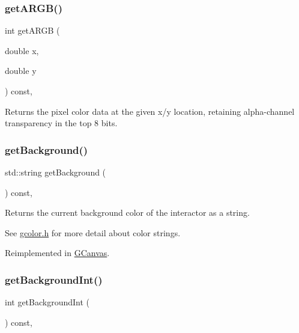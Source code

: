 \subsubsection{\texorpdfstring{get\+A\+R\+G\+B()}{getARGB()}}
{\footnotesize\ttfamily int get\+A\+R\+GB (\begin{DoxyParamCaption}\item[{double}]{x,  }\item[{double}]{y }\end{DoxyParamCaption}) const\hspace{0.3cm}{\ttfamily [virtual]}, {\ttfamily [inherited]}}



Returns the pixel color data at the given x/y location, retaining alpha-\/channel transparency in the top 8 bits. 

\mbox{\label{classGDrawingSurface_a808e22cc1fdfbecf71ed8c64ef4600e0}} 
\subsubsection{\texorpdfstring{get\+Background()}{getBackground()}}
{\footnotesize\ttfamily std\+::string get\+Background (\begin{DoxyParamCaption}{ }\end{DoxyParamCaption}) const\hspace{0.3cm}{\ttfamily [virtual]}, {\ttfamily [inherited]}}



Returns the current background color of the interactor as a string. 

See \mbox{\hyperlink{gcolor_8h_source}{gcolor.\+h}} for more detail about color strings. 

Reimplemented in \mbox{\hyperlink{classGCanvas_a4a62c51b7244a7642b88065e3a07ae82}{G\+Canvas}}.

\mbox{\label{classGDrawingSurface_a9e827257a55cb8cf4d9de2ec6bcfd7a0}} 
\subsubsection{\texorpdfstring{get\+Background\+Int()}{getBackgroundInt()}}
{\footnotesize\ttfamily int get\+Background\+Int (\begin{DoxyParamCaption}{ }\end{DoxyParamCaption}) const\hspace{0.3cm}{\ttfamily [virtual]}, {\ttfamily [inherited]}}



